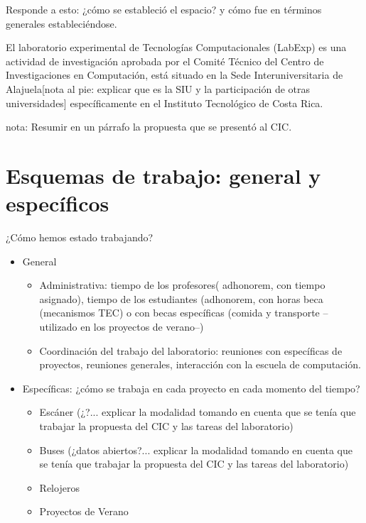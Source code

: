 \documentclass[conference]{IEEEtran}
\begin{document}
Responde a esto: ¿cómo se estableció el espacio? y cómo fue en términos generales estableciéndose.

El laboratorio experimental de Tecnologías Computacionales (LabExp) es una actividad de investigación aprobada por el Comité Técnico del Centro de Investigaciones en Computación, está situado en la Sede Interuniversitaria de Alajuela[nota al pie: explicar que es la SIU y la participación de otras universidades] específicamente en el Instituto Tecnológico de Costa Rica. 

nota: Resumir en un párrafo la propuesta que se presentó al CIC.


\section{Esquemas de trabajo: general y específicos}

¿Cómo hemos estado trabajando?

\begin{itemize}

\item General
    
    \begin{itemize}
    
    \item Administrativa: tiempo de los profesores( adhonorem, con tiempo asignado), tiempo de los estudiantes (adhonorem, con horas beca (mecanismos TEC) o con becas específicas (comida y transporte --utilizado en los proyectos de verano--)
    
    \item Coordinación del trabajo del laboratorio: reuniones con específicas de proyectos, reuniones generales, interacción con la escuela de computación.
    
    \end{itemize}

\item Específicas: ¿cómo se trabaja en cada proyecto en cada momento del tiempo?
    
    \begin{itemize}
    \item Escáner (¿?... explicar la modalidad tomando en cuenta que se tenía que trabajar la propuesta del CIC y las tareas del laboratorio)
    
    \item Buses (¿datos abiertos?... explicar la modalidad tomando en cuenta que se tenía que trabajar la propuesta del CIC y las tareas del laboratorio)
    
    \item Relojeros
    
    \item Proyectos de Verano

    \end{itemize}


\end{itemize}
  
\end{document}
